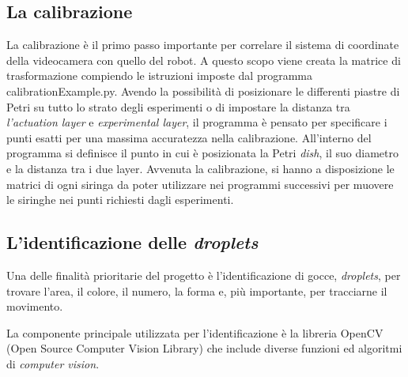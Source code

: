 \subsection{La calibrazione}
\label{sec:01123}
La calibrazione è il primo passo importante per correlare il sistema di coordinate della videocamera con quello del robot. A questo scopo viene creata la matrice di trasformazione compiendo le istruzioni imposte dal programma calibrationExample.py. 
Avendo la possibilità di posizionare le differenti piastre di Petri su tutto lo strato degli esperimenti o di impostare la distanza tra \emph{l'actuation layer} e \emph{experimental layer}, il programma è pensato per specificare i punti esatti per una massima accuratezza nella calibrazione. All'interno del programma si definisce il punto in cui è posizionata la Petri \emph{dish}, il suo diametro e la distanza tra i due layer.
Avvenuta la calibrazione, si hanno a disposizione le matrici di ogni siringa da poter utilizzare nei programmi successivi per muovere le siringhe nei punti richiesti dagli esperimenti.

\subsection{L'identificazione delle \emph{droplets}}
\label{sec:02123}
Una delle finalità prioritarie del progetto è l'identificazione di gocce, \emph{droplets}, per trovare l'area, il colore, il numero, la forma e, più importante, per tracciarne il movimento.

La componente principale utilizzata per l'identificazione è la libreria OpenCV (Open Source Computer Vision Library)\cite{opencv} che include diverse funzioni ed algoritmi di \emph{computer vision}. 











 

